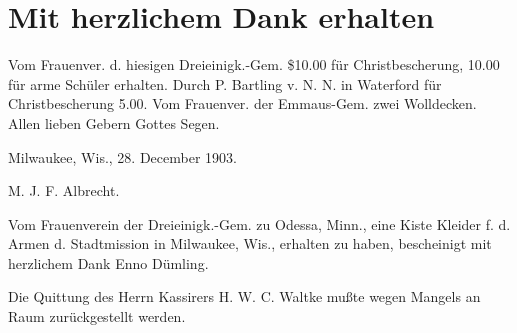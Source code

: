 \chapter[Dank und Empfang]{Mit herzlichem Dank erhalten}

Vom Frauenver. d. hiesigen Dreieinigk.-Gem. \$10.00 für Christbescherung, 10.00 für arme Schüler erhalten. Durch P. Bartling v. N. N. in Waterford für Christbescherung 5.00. Vom Frauenver. der Emmaus-Gem. zwei Wolldecken. Allen lieben Gebern Gottes Segen.

Milwaukee, Wis., 28. December 1903.

M. J. F. Albrecht.

Vom Frauenverein der Dreieinigk.-Gem. zu Odessa, Minn., eine Kiste Kleider f. d. Armen d. Stadtmission in Milwaukee, Wis., erhalten zu haben, bescheinigt mit herzlichem Dank Enno Dümling.

Die Quittung des Herrn Kassirers H. W. C. Waltke mußte wegen Mangels an Raum zurückgestellt werden.
